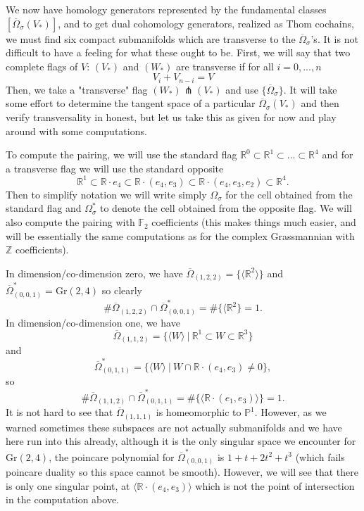 \documentclass{amsart}          %
\newcommand{\Gr}{\mathrm{Gr}}
\begin{document}
We now have homology generators represented by the fundamental classes $[\overline{\Omega}_{\sigma}(V_{\ast})]$, and to get dual cohomology generators, realized as Thom cochains, we must find six compact submanifolds which are transverse to the $\overline{\Omega}_{\sigma}$'s. It is not difficult to have a feeling for what these ought to be. First, we will say that two complete flags of $V$: $(V_{\ast})$ and $(W_{\ast})$ are transverse if for all $i= 0, ..., n$
\[
V_i + V_{n- i} = V
\]
Then, we take a "transverse" flag $(W_{\ast})\pitchfork (V_{\ast})$ and use $\lbrace \overline{\Omega}_{\sigma}\rbrace$. It will take some effort to determine the tangent space of a particular $\overline{\Omega}_{\sigma}(V_{\ast})$ and then verify transversality in honest, but let us take this as given for now and play around with some computations.

To compute the pairing, we will use the standard flag $\mathbb{R}^0\subset \mathbb{R}^1\subset...\subset\mathbb{R}^4$ and for a transverse flag we will use the standard opposite
\[
\mathbb{R}^1\subset \mathbb{R}\cdot e_4\subset \mathbb{R}\cdot (e_4, e_3)\subset \mathbb{R}\cdot (e_4, e_3, e_2)\subset \mathbb{R}^4.
\]
Then to simplify notation we will write simply $\Omega_{\sigma}$ for the cell obtained from the standard flag and $\Omega_{\sigma}^*$ to denote the cell obtained from the opposite flag. We will also compute the pairing with $\mathbb{F}_2$ coefficients (this makes things much easier, and will be essentially the same computations as for the complex Grassmannian with $\mathbb{Z}$ coefficients). 

In dimension/co-dimension zero, we have $\overline{\Omega}_{(1,2,2)}= \lbrace \langle \mathbb{R}^2\rangle \rbrace$ and $\overline{\Omega}_{(0,0,1)}^{\ast} = \Gr(2, 4)$ so clearly
\[
\# \overline{\Omega}_{(1, 2, 2)}\cap \overline{\Omega}_{(0,0,1)}^{\ast} =\# \lbrace \langle \mathbb{R}^2\rbrace = 1. 
\]
In dimension/co-dimension one, we have 
\[
\overline{\Omega}_{(1,1,2)} = \lbrace \langle W\rangle \ | \ \mathbb{R}^1\subset W\subset \mathbb{R}^3\rbrace
\]
and 
\[
\overline{\Omega}_{(0,1,1)}^{\ast}= \lbrace \langle W\rangle \ | \ W\cap \mathbb{R}\cdot (e_4, e_3)\ne 0\rbrace, 
\]
so 
\[
\# \overline{\Omega}_{(1,1,2)} \cap \overline{\Omega}_{(0,1,1)}^{\ast}= \# \lbrace \langle \mathbb{R}\cdot (e_1, e_3)\rangle \rbrace = 1. 
\]
It is not hard to see that $\overline{\Omega}_{(1, 1, 1)}$ is homeomorphic to $\mathbb{P}^1$. However, as we warned sometimes these subspaces are not actually submanifolds and we have here run into this already, although it is the only singular space we encounter for $\Gr(2, 4)$, the poincare polynomial for $\overline{\Omega}_{(0,0,1)}^{\ast}$ is $1+ t+ 2t^2+ t^3$ (which fails poincare duality so this space cannot be smooth). However, we will see that there is only one singular point, at $\langle \mathbb{R}\cdot(e_4, e_3)\rangle$ which is not the point of intersection in the computation above. 
\end{document}

